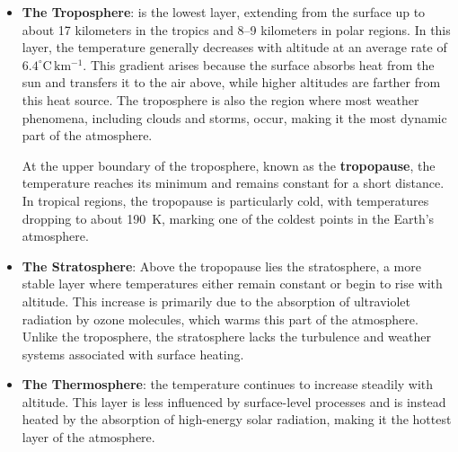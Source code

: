 \begin{itemize}
	\item \textbf{The Troposphere}: is the lowest layer, extending from the surface up to about 17 kilometers in the tropics and 8--9 kilometers in polar regions. In this layer, the temperature generally decreases with altitude at an average rate of $6.4^\circ \mathrm{C \, km^{-1}}$. This gradient arises because the surface absorbs heat from the sun and transfers it to the air above, while higher altitudes are farther from this heat source. The troposphere is also the region where most weather phenomena, including clouds and storms, occur, making it the most dynamic part of the atmosphere.

	      At the upper boundary of the troposphere, known as the \textbf{tropopause}, the temperature reaches its minimum and remains constant for a short distance. In tropical regions, the tropopause is particularly cold, with temperatures dropping to about 190~K, marking one of the coldest points in the Earth's atmosphere.

	\item \textbf{The Stratosphere}: Above the tropopause lies the stratosphere, a more stable layer where temperatures either remain constant or begin to rise with altitude. This increase is primarily due to the absorption of ultraviolet radiation by ozone molecules, which warms this part of the atmosphere. Unlike the troposphere, the stratosphere lacks the turbulence and weather systems associated with surface heating.

	\item \textbf{The Thermosphere}:  the temperature continues to increase steadily with altitude. This layer is less influenced by surface-level processes and is instead heated by the absorption of high-energy solar radiation, making it the hottest layer of the atmosphere.
\end{itemize}


